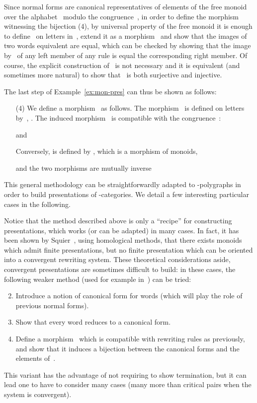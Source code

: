 \documentclass{LMCS}
\begin{document}
Since normal forms are canonical representatives of elements of the free
monoid~ over the alphabet~ modulo the congruence~,
in order to define the morphism~ witnessing the bijection (4), by universal
property of the free monoid it is enough to define~ on letters in~,
extend it as a morphism~ and show that the images of two words
equivalent \wrt  are equal, which can be checked by showing that the
image by~ of any left member of any rule is equal the corresponding right
member. Of course, the explicit construction of~ is not necessary and it is
equivalent (and sometimes more natural) to show that~ is both surjective and
injective.

\begin{exa}
  The last step of Example~\ref{ex:mon-pres} can thus be shown as follows:
  \begin{itemize}
  \item[(4)] We define a morphism~ as follows. The
    morphism~ is defined on letters by~, . The
    induced morphism~ is compatible with the
    congruence~:
    
    and
    
    Conversely,  is defined by , which is a morphism of monoids,
    \ie
    
    and the two morphisms are mutually inverse
    
  \end{itemize}
\end{exa}

This general methodology can be straightforwardly adapted to -polygraphs in
order to build presentations of -categories. We detail a few interesting
particular cases in the following.

\begin{rem}
  Notice that the method described above is only a ``recipe'' for constructing
  presentations, which works (or can be adapted) in many cases. In fact, it has
  been shown by Squier~\cite{squier:word-problems,
    lafont-proute:homology-monoids}, using homological methods, that there
  exists monoids which admit finite presentations, but no finite presentation
  which can be oriented into a convergent rewriting system. These theoretical
  considerations aside, convergent presentations are sometimes difficult to
  build: in these cases, the following weaker method (used for example
  in~\cite{lafont:boolean-circuits}) can be tried:
  \begin{enumerate}
    \setcounter{enumi}{1}
  \item Introduce a notion of canonical form for words (which will play the role
    of previous normal forms).
  \item Show that every word reduces to a canonical form.
  \item Define a morphism~ which is compatible with rewriting
    rules as previously, and show that it induces a bijection between the
    canonical forms and the elements of~.
  \end{enumerate}
  This variant has the advantage of not requiring to show termination, but it
  can lead one to have to consider many cases (many more than critical pairs when
  the system is convergent).
\end{rem}
\end{document}
